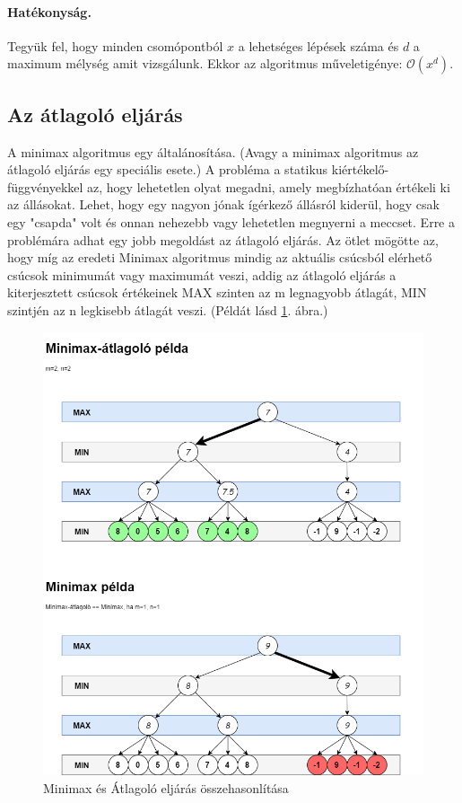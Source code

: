 \documentclass[twoside, a4paper, 12pt]{article}
\begin{document}
\paragraph{Hatékonyság.} Tegyük fel, hogy minden csomópontból $x$ a lehetséges lépések száma és $d$ a maximum mélység amit vizsgálunk. Ekkor az algoritmus műveletigénye: $ \mathcal{O}(x^d)$.

\subsection{Az átlagoló eljárás}
A minimax algoritmus egy általánosítása. (Avagy a minimax algoritmus az átlagoló eljárás egy speciális esete.) A probléma a statikus kiértékelő-függvényekkel az, hogy lehetetlen olyat megadni, amely megbízhatóan értékeli ki az állásokat. Lehet, hogy egy nagyon jónak ígérkező állásról kiderül, hogy csak egy "csapda" volt és onnan nehezebb vagy lehetetlen megnyerni a meccset. Erre a problémára adhat egy jobb megoldást az átlagoló eljárás. Az ötlet mögötte az, hogy míg az eredeti Minimax algoritmus mindig az aktuális csúcsból elérhető csúcsok minimumát vagy maximumát veszi, addig az átlagoló eljárás a kiterjesztett csúcsok értékeinek MAX szinten az m legnagyobb átlagát, MIN szintjén az n legkisebb átlagát veszi. (Példát lásd \ref{fig:minimaxVsAverageExample}. ábra.)\cite{bevMiHu}

\begin{figure}[htbp]
	\centering
	\includegraphics[width=\textwidth]{img/minimaxVsAverageExample.png}
	\caption{Minimax és Átlagoló eljárás összehasonlítása\cite{bevMiHu}}
	\label{fig:minimaxVsAverageExample}
\end{figure}
\end{document}
